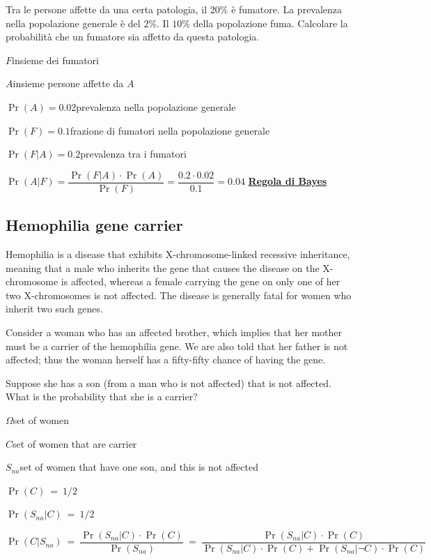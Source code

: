 \documentclass[12pt,openany]{book}
\theoremstyle{mio}
\theoremstyle{liscio}
\begin{document}
Tra le persone affette da una certa patologia, il $20\%$ è fumatore. La prevalenza nella popolazione generale è del $2\%$. Il $10\%$ della popolazione fuma. Calcolare la probabilità che un fumatore sia affetto da questa patologia.


$F$\hfill insieme dei fumatori

$A$\hfill insieme persone affette da $A$

$\Pr(A)=0.02$\hfill prevalenza nella popolazione generale

$\Pr(F)=0.1$\hfill frazione di fumatori nella popolazione generale

$\Pr(F|A)=0.2$\hfill prevalenza tra i fumatori

$\Pr(A|F)=\dfrac{\Pr(F|A)\cdot \Pr(A)}{\Pr(F)}=\dfrac{0.2\cdot0.02}{0.1}=0.04$
\hfill{}\clearpage\hfill
\hfill\textbf{{\color{brown}\hyperref[RegolaBayes]{Regola di Bayes} \faShare}}
\subsection{Hemophilia gene carrier }
\label{Hemophilia}

Hemophilia is a disease that exhibits X-chromosome-linked recessive inheritance, meaning that a male who inherits the gene that causes the disease on the X-chromosome is affected, whereas a
female carrying the gene on only one of her two X-chromosomes is not affected. The disease is generally fatal for women who inherit two such genes.

Consider a woman who has an affected brother, which implies that her mother must be a carrier of the hemophilia gene. We are also told that her father is not affected; thus the woman herself has a fifty-fifty chance of having the gene.

Suppose she has a son (from a man who is not affected) that is not affected. What is the probability that she is a carrier?

$\Omega$\hfill  set of women 

$C$\hfill set of women that are carrier

$S_{na}$\hfill set of women that have one son, and this is not affected

$\Pr(C)\ =\ 1/2$\hfill 

$\Pr(S_{na}|C)\ =\ 1/2$\hfill 

$\Pr(C|S_{na})\ =\ \dfrac{\Pr(S_{na}|C)\cdot \Pr(C)}{\Pr(S_{na})}\ =\ \dfrac{\Pr(S_{na}|C)\cdot \Pr(C)}{\Pr(S_{na}|C)\cdot \Pr(C)+\Pr(S_{na}|\neg C)\cdot \Pr(C)}$
\end{document}
